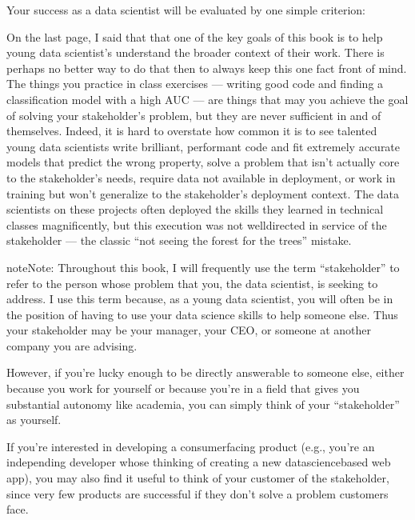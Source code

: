 \documentclass[letterpaper,10pt,english]{jupyterBook}
\begin{document}
\begin{sphinxShadowBox}

\sphinxAtStartPar
Your success as a data scientist will  be evaluated by one simple criterion: 
\end{sphinxShadowBox}

\sphinxAtStartPar
On the last page, I said that that one of the key goals of this book is to help young data scientist’s understand the broader context of their work. There is perhaps no better way to do that then to always keep this one fact front of mind. The things you practice in class exercises — writing good code and finding a classification model with a high AUC — are things that may  you achieve the goal of solving your stakeholder’s problem, but they are never sufficient in and of themselves. Indeed, it is hard to overstate how common it is to see talented young data scientists write brilliant, performant code and fit extremely accurate models that predict the wrong property, solve a problem that isn’t actually core to the stakeholder’s needs, require data not available in deployment, or work in training but won’t generalize to the stakeholder’s deployment context. The data scientists on these projects often deployed the skills they learned in technical classes magnificently, but this execution was not well\sphinxhyphen{}directed in service of the stakeholder — the classic “not seeing the forest for the trees” mistake.

\begin{sphinxadmonition}{note}{Note:}
\sphinxAtStartPar
Throughout this book, I will frequently use the term “stakeholder” to refer to the person whose problem that you, the data scientist, is seeking to address. I use this term because, as a young data scientist, you will often be in the position of having to use your data science skills to help someone else. Thus your stakeholder may be your manager, your CEO, or someone at another company you are advising.

\sphinxAtStartPar
However, if you’re lucky enough to  be directly answerable to someone else, either because you work for yourself or because you’re in a field that gives you substantial autonomy like academia, you can simply think of your “stakeholder” as yourself.

\sphinxAtStartPar
If you’re interested in developing a consumer\sphinxhyphen{}facing product (e.g., you’re an independing developer whose thinking of creating a new data\sphinxhyphen{}science\sphinxhyphen{}based web app), you may also find it useful to think of your customer of the stakeholder, since very few products are successful if they don’t solve a problem customers face.
\end{sphinxadmonition}
\end{document}
